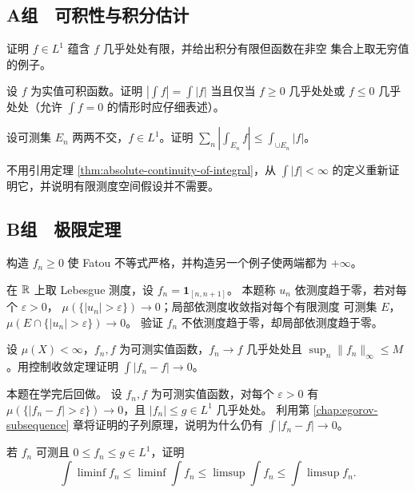 \subsection*{A组　可积性与积分估计}
\begin{enumerate}[label=\textbf{\thechapter.\arabic*.}]
证明 \(f\in L^1\) 蕴含 \(f\) 几乎处处有限，并给出积分有限但函数在非空
集合上取无穷值的例子。

设 \(f\) 为实值可积函数。证明 \(\left|\int f\right|=\int|f|\) 当且仅当 \(f\ge0\) 几乎处处或
\(f\le0\) 几乎处处（允许 \(\int f=0\) 的情形时应仔细表述）。

设可测集 \(E_n\) 两两不交，\(f\in L^1\)。证明
\(\sum_n|\int_{E_n}f|\le\int_{\cup E_n}|f|\)。

不用引用定理 \ref{thm:absolute-continuity-of-integral}，从
\(\int|f|<\infty\) 的定义重新证明它，并说明有限测度空间假设并不需要。

\end{enumerate}
\subsection*{B组　极限定理}
\begin{enumerate}[label=\textbf{\thechapter.\arabic*.},resume]
构造 \(f_n\ge0\) 使 Fatou 不等式严格，并构造另一个例子使两端都为
\(+\infty\)。

在 \(\mathbb{R}\) 上取 Lebesgue 测度，设 \(f_n=\mathbf1_{[n,n+1]}\)。
本题称 \(u_n\) 依测度趋于零，若对每个 \(\varepsilon>0\)，
\(\mu(\{|u_n|>\varepsilon\})\to0\)；局部依测度收敛指对每个有限测度
可测集 \(E\)，\(\mu(E\cap\{|u_n|>\varepsilon\})\to0\)。
验证 \(f_n\) 不依测度趋于零，却局部依测度趋于零。

设 \(\mu(X)<\infty\)，\(f_n,f\) 为可测实值函数，\(f_n\to f\) 几乎处处且
\(\sup_n\|f_n\|_\infty\le M\)。用控制收敛定理证明
\(\int|f_n-f|\to0\)。

本题在学完后回做。
设 \(f_n,f\) 为可测实值函数，对每个 \(\varepsilon>0\) 有
\(\mu(\{|f_n-f|>\varepsilon\})\to0\)，且 \(|f_n|\le g\in L^1\) 几乎处处。
利用第
\ref{chap:egorov-subsequence} 章将证明的子列原理，说明为什么仍有
\(\int|f_n-f|\to0\)。

若 \(f_n\) 可测且 \(0\le f_n\le g\in L^1\)，证明
\[
 \int\liminf f_n\le\liminf\int f_n
 \le\limsup\int f_n\le\int\limsup f_n.
\]

\end{enumerate}
